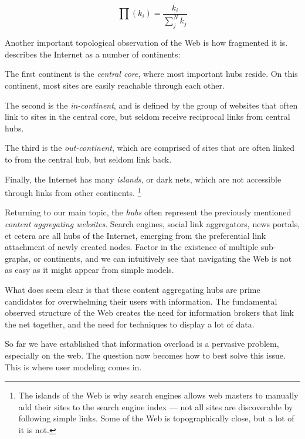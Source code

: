 \begin{equation}\label{eq:albert:prob}
  \prod(k_i)  = \frac{k_i}{\sum_{j}^N k_j}
\end{equation} 

\vspace{1em}
\noindent
Another important topological observation of the Web is how fragmented it is. 
\citet[p166]{Barabasi2003} describes the Internet as a number of continents:

\begin{itemize*}
  \item The first continent is the \emph{central core}, where most important hubs reside. On this continent, most sites are easily reachable through each other.
  \item The second is the \emph{in-continent}, and is defined by the group of websites that often link to sites in the central core, but seldom receive reciprocal links from central hubs.
  \item The third is the \emph{out-continent}, which are comprised of sites that are often linked to from the central hub, but seldom link back.
  \item Finally, the Internet has many \emph{islands}, or dark nets, which are not accessible through links from other continents. 
\footnote{The islands of the Web is why search engines allows web masters to manually add their sites to the search engine index --- not all sites are discoverable by following simple links. Some of the Web is topographically close, but a lot of it is not.}
\end{itemize*}

Returning to our main topic, the \emph{hubs} often represent the previously mentioned \emph{content aggregating websites}. 
Search engines, social link aggregators, news portals, et cetera are all hubs of the Internet, emerging from the preferential 
link attachment of newly created nodes. 
Factor in the existence of multiple sub-graphs, or continents, and we can intuitively see that navigating the Web is not as 
easy as it might appear from simple models.

What does seem clear is that these content aggregating hubs are prime candidates for overwhelming their users with information. 
The fundamental observed structure of the Web creates the need for information brokers that link the net together, 
and the need for techniques to display a lot of data. 

So far we have established that information overload is a pervasive problem, especially on the web.
The question now becomes how to best solve this issue. 
This is where user modeling comes in.


